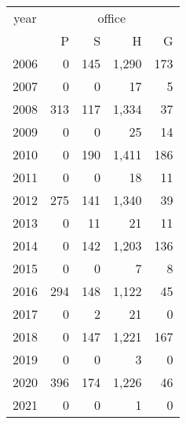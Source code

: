\footnotesize\begin{tabular}[t]{lrrrr}
\toprule
\multicolumn{1}{c}{year} & \multicolumn{4}{c}{office} \\
\cmidrule(l{3pt}r{3pt}){1-1} \cmidrule(l{3pt}r{3pt}){2-5}
  & P & S & H & G\\
\midrule
2006 & 0 & 145 & 1,290 & 173\\
2007 & 0 & 0 & 17 & 5\\
2008 & 313 & 117 & 1,334 & 37\\
2009 & 0 & 0 & 25 & 14\\
2010 & 0 & 190 & 1,411 & 186\\
2011 & 0 & 0 & 18 & 11\\
2012 & 275 & 141 & 1,340 & 39\\
2013 & 0 & 11 & 21 & 11\\
2014 & 0 & 142 & 1,203 & 136\\
2015 & 0 & 0 & 7 & 8\\
2016 & 294 & 148 & 1,122 & 45\\
2017 & 0 & 2 & 21 & 0\\
2018 & 0 & 147 & 1,221 & 167\\
2019 & 0 & 0 & 3 & 0\\
2020 & 396 & 174 & 1,226 & 46\\
2021 & 0 & 0 & 1 & 0\\
\bottomrule
\end{tabular}
